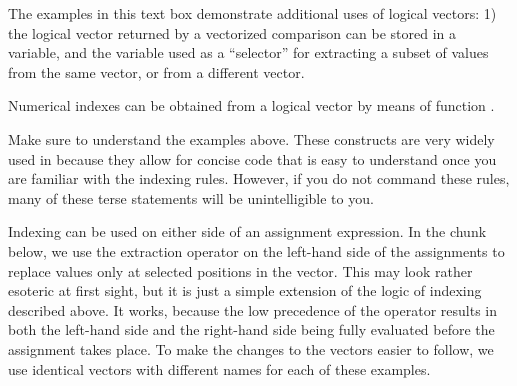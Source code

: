 \documentclass[krantz2]{krantz}\usepackage{knitr}
\begin{document}
\begin{playground}
The examples in this text box demonstrate additional uses of logical vectors: 1) the logical vector returned by a vectorized comparison can be stored in a variable, and the variable used as a ``selector'' for extracting a subset of values from the same vector, or from a different vector.

\begin{knitrout}\footnotesize
{}\color{fgcolor}\begin{kframe}
\begin{alltt}
 \hlkwb{<-} \hlstd{letters[}\hlopt{:}\hlstd{]}
 \hlkwb{<-} \hlopt{:}
 \hlkwb{<-}  \hlopt{>} 
\end{alltt}
\end{kframe}
\end{knitrout}

Numerical indexes can be obtained from a logical vector by means of function .

\begin{knitrout}\footnotesize
{}\color{fgcolor}\begin{kframe}
\begin{alltt}
 \hlkwb{<-}  \hlopt{>} \hlstd{)}
\end{alltt}
\end{kframe}
\end{knitrout}

Make sure to understand the examples above. These constructs are very widely used in \Rlang because they allow for concise code that is easy to understand once you are familiar with the indexing rules. However, if you do not command these rules, many of these terse statements will be unintelligible to you.
\end{playground}

Indexing can be used on either side of an assignment expression. In the chunk below, we use the extraction operator on the left-hand side of the assignments to replace values only at selected positions in the vector. This may look rather esoteric at first sight, but it is just a simple extension of the logic of indexing described above. It works, because the low precedence of the \Roperator{<-} operator results in both the left-hand side and the right-hand side being fully evaluated before the assignment takes place. To make the changes to the vectors easier to follow, we use identical vectors with different names for each of these examples.
\end{document}
